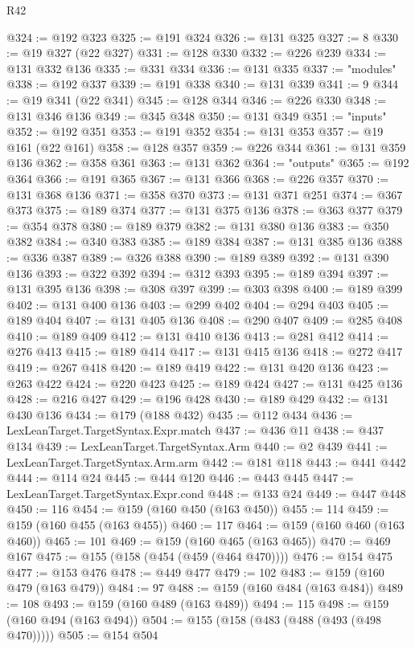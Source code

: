\begin{lexlean}{R42}
\begin{coremodule}
@324 := @192 @323
@325 := @191 @324
@326 := @131 @325
@327 := 8
@330 := @19 @327 (@22 @327)
@331 := @128 @330
@332 := @226 @239
@334 := @131 @332 @136
@335 := @331 @334
@336 := @131 @335
@337 := "modules"
@338 := @192 @337
@339 := @191 @338
@340 := @131 @339
@341 := 9
@344 := @19 @341 (@22 @341)
@345 := @128 @344
@346 := @226 @330
@348 := @131 @346 @136
@349 := @345 @348
@350 := @131 @349
@351 := "inputs"
@352 := @192 @351
@353 := @191 @352
@354 := @131 @353
@357 := @19 @161 (@22 @161)
@358 := @128 @357
@359 := @226 @344
@361 := @131 @359 @136
@362 := @358 @361
@363 := @131 @362
@364 := "outputs"
@365 := @192 @364
@366 := @191 @365
@367 := @131 @366
@368 := @226 @357
@370 := @131 @368 @136
@371 := @358 @370
@373 := @131 @371 @251
@374 := @367 @373
@375 := @189 @374
@377 := @131 @375 @136
@378 := @363 @377
@379 := @354 @378
@380 := @189 @379
@382 := @131 @380 @136
@383 := @350 @382
@384 := @340 @383
@385 := @189 @384
@387 := @131 @385 @136
@388 := @336 @387
@389 := @326 @388
@390 := @189 @389
@392 := @131 @390 @136
@393 := @322 @392
@394 := @312 @393
@395 := @189 @394
@397 := @131 @395 @136
@398 := @308 @397
@399 := @303 @398
@400 := @189 @399
@402 := @131 @400 @136
@403 := @299 @402
@404 := @294 @403
@405 := @189 @404
@407 := @131 @405 @136
@408 := @290 @407
@409 := @285 @408
@410 := @189 @409
@412 := @131 @410 @136
@413 := @281 @412
@414 := @276 @413
@415 := @189 @414
@417 := @131 @415 @136
@418 := @272 @417
@419 := @267 @418
@420 := @189 @419
@422 := @131 @420 @136
@423 := @263 @422
@424 := @220 @423
@425 := @189 @424
@427 := @131 @425 @136
@428 := @216 @427
@429 := @196 @428
@430 := @189 @429
@432 := @131 @430 @136
@434 := @179 (@188 @432)
@435 := @112 @434
@436 := LexLeanTarget.TargetSyntax.Expr.match
@437 := @436 @11
@438 := @437 @134
@439 := LexLeanTarget.TargetSyntax.Arm
@440 := @2 @439
@441 := LexLeanTarget.TargetSyntax.Arm.arm
@442 := @181 @118
@443 := @441 @442
@444 := @114 @24
@445 := @444 @120
@446 := @443 @445
@447 := LexLeanTarget.TargetSyntax.Expr.cond
@448 := @133 @24
@449 := @447 @448
@450 := 116
@454 := @159 (@160 @450 (@163 @450))
@455 := 114
@459 := @159 (@160 @455 (@163 @455))
@460 := 117
@464 := @159 (@160 @460 (@163 @460))
@465 := 101
@469 := @159 (@160 @465 (@163 @465))
@470 := @469 @167
@475 := @155 (@158 (@454 (@459 (@464 @470))))
@476 := @154 @475
@477 := @153 @476
@478 := @449 @477
@479 := 102
@483 := @159 (@160 @479 (@163 @479))
@484 := 97
@488 := @159 (@160 @484 (@163 @484))
@489 := 108
@493 := @159 (@160 @489 (@163 @489))
@494 := 115
@498 := @159 (@160 @494 (@163 @494))
@504 := @155 (@158 (@483 (@488 (@493 (@498 @470)))))
@505 := @154 @504

\end{coremodule}
\end{lexlean}
